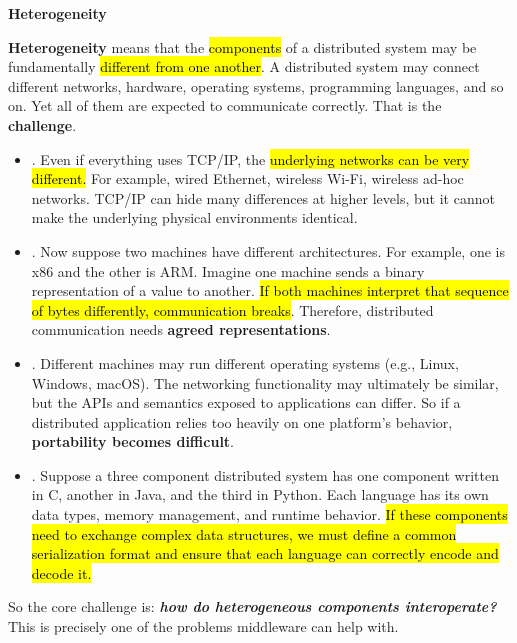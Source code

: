 \newpage

\begin{flushleft}
    \textcolor{Red2}{ \textbf{Heterogeneity}}
\end{flushleft}
\textbf{Heterogeneity} means that the \hl{components} of a distributed system may be fundamentally \hl{different from one another}. A distributed system may connect different networks, hardware, operating systems, programming languages, and so on. Yet all of them are expected to communicate correctly. That is the \textbf{challenge}.
\begin{itemize}
    \item {}. Even if everything uses TCP/IP, the \hl{underlying networks can be very different.} For example, wired Ethernet, wireless Wi-Fi, wireless ad-hoc networks. TCP/IP can hide many differences at higher levels, but it cannot make the underlying physical environments identical.

    \item {}. Now suppose two machines have different architectures. For example, one is x86 and the other is ARM. Imagine one machine sends a binary representation of a value to another. \hl{If both machines interpret that sequence of bytes differently, communication breaks}. Therefore, distributed communication needs \textbf{agreed representations}.

    \item {}. Different machines may run different operating systems (e.g., Linux, Windows, macOS). The networking functionality may ultimately be similar, but the APIs and semantics exposed to applications can differ. So if a distributed application relies too heavily on one platform's behavior, \textbf{portability becomes difficult}.

    \item {}. Suppose a three component distributed system has one component written in C, another in Java, and the third in Python. Each language has its own data types, memory management, and runtime behavior. \hl{If these components need to exchange complex data structures, we must define a common serialization format and ensure that each language can correctly encode and decode it.}
\end{itemize}
So the core challenge is: \emph{\textbf{how do heterogeneous components interoperate?}} This is precisely one of the problems middleware can help with.

